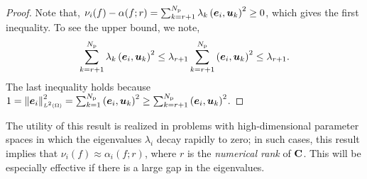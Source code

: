 \begin{proof} 


Note that, $\nu_i(f) - \alpha(f; r)  = \sum_{k=r+1}^\Np \lambda_k \ip{\vec{e}_i}{\vec{u}_k}^2 \geq 0$,
which gives the first inequality. To see the upper bound, we note,
\[
   \sum_{k=r+1}^\Np \lambda_k \ip{\vec{e}_i}{\vec{u}_k}^2 \leq \lambda_{r+1} \sum_{k=r+1}^\Np \ip{\vec{e}_i}{\vec{u}_k}^2
   \leq \lambda_{r+1}. 
\]
The last inequality holds because 
$1 = \norm{\vec{e}_i}^2 = 
\sum_{k = 1}^\Np \ip{\vec{e}_i}{\vec{u}_k}^2 
\geq \sum_{k=r+1}^\Np \ip{\vec{e}_i}{\vec{u}_k}^2$.
\end{proof} 
The utility of this result is realized in problems with 
high-dimensional parameter spaces in which 
the eigenvalues $\lambda_i$ decay rapidly to zero; in 
such cases, this result implies that  $\nu_i(f) \approx \alpha_i(f; r)$,
where $r$ is the \emph{numerical rank} of $\mathbf{{C}}$.  This will be especially
effective if there is a large gap in the eigenvalues.  

